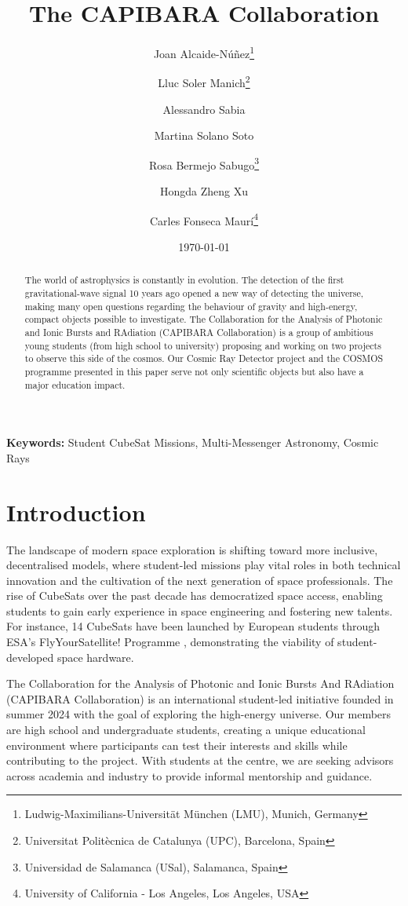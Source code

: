 \documentclass[11pt]{article}
\title{The CAPIBARA Collaboration}
\author{
    Joan Alcaide-Núñez\thanks{Ludwig-Maximilians-Universität München (LMU), Munich, Germany} \and
    Lluc Soler Manich\thanks{Universitat Politècnica de Catalunya (UPC), Barcelona, Spain} \and
    Alessandro Sabia \and
    Martina Solano Soto \and
    Rosa Bermejo Sabugo\thanks{Universidad de Salamanca (USal), Salamanca, Spain} \and
    Hongda Zheng Xu \and
    Carles Fonseca Maurí\thanks{University of California - Los Angeles, Los Angeles, USA}
}
\date{\today}
\begin{document}
\maketitle

\begin{abstract}

The world of astrophysics is constantly in evolution. The detection of the first gravitational-wave signal 10 years ago opened a new way of detecting the universe, making many open questions regarding the behaviour of gravity and high-energy, compact objects possible to investigate. The Collaboration for the Analysis of Photonic and Ionic Bursts and RAdiation (CAPIBARA Collaboration) is a group of ambitious young students (from high school to university) proposing and working on two projects to observe this side of the cosmos. Our Cosmic Ray Detector project and the COSMOS programme presented in this paper serve not only scientific objects but also have a major education impact.

\end{abstract}

\textbf{Keywords:} Student CubeSat Missions, Multi-Messenger Astronomy, Cosmic Rays

\section{Introduction}

The landscape of modern space exploration is shifting toward more inclusive, decentralised models, where student-led missions play vital roles in both technical innovation and the cultivation of the next generation of space professionals. The rise of CubeSats over the past decade has democratized space access, enabling students to gain early experience in space engineering and fostering new talents. For instance, 14 CubeSats have been launched by European students through ESA's FlyYourSatellite! Programme \cite{missing}, demonstrating the viability of student-developed space hardware.

The Collaboration for the Analysis of Photonic and Ionic Bursts And RAdiation (CAPIBARA Collaboration) is an international student-led initiative founded in summer 2024 with the goal of exploring the high-energy universe. Our members are high school and undergraduate students, creating a unique educational environment where participants can test their interests and skills while contributing to the project. With students at the centre, we are seeking advisors across academia and industry to provide informal mentorship and guidance.
\end{document}
